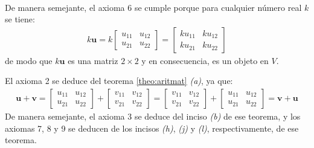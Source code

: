 \documentclass[a4paper,12pt]{article}
\begin{document}
\begin{enumerate}[\textsc{Ejemplo} 1:, wide=\parindent]
\begin{align*}
    \end{align*}
    De manera semejante, el axioma 6 se cumple porque para cualquier número
    real $k$ se tiene:
    \begin{align*}
      k\mathbf{u}=k
      \begin{bmatrix}
        u_{11} & u_{12} \\
        u_{21} & u_{22}
      \end{bmatrix}
      =
      \begin{bmatrix}
        ku_{11} & ku_{12} \\
        ku_{21} & ku_{22}
      \end{bmatrix}
    \end{align*}
    de modo que $k\mathbf{u}$ es una matriz $2\times 2$ y en consecuencia, es
    un objeto en $V$.

    El axioma 2 se deduce del teorema \ref{theo:aritmat} \emph{(a)}, ya que:
    \begin{align*}
      \mathbf{u}+\mathbf{v}=
      \begin{bmatrix}
        u_{11} & u_{12} \\
        u_{21} & u_{22}
      \end{bmatrix}
      +
      \begin{bmatrix}
        v_{11} & v_{12} \\
        v_{21} & v_{22}
      \end{bmatrix}
      =
      \begin{bmatrix}
        v_{11} & v_{12} \\
        v_{21} & v_{22}
      \end{bmatrix}
      +
      \begin{bmatrix}
        u_{11} & u_{12} \\
        u_{21} & u_{22}
      \end{bmatrix}
      =
      \mathbf{v}+\mathbf{u}
    \end{align*}
    De manera semejante, el axioma 3 se deduce del inciso \emph{(b)} de ese
    teorema, y los axiomas 7, 8 y 9 se deducen de los incisos \emph{(h)},
    \emph{(j)} y \emph{(l)}, respectivamente, de ese teorema.


\end{enumerate}
\end{document}
